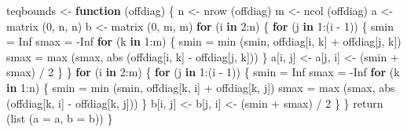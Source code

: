 \documentclass[
  12pt,
]{book}
\newenvironment{Shaded}{\begin{snugshade}}{\end{snugshade}}
\newcommand{\AttributeTok}[1]{\textcolor[rgb]{0.77,0.63,0.00}{#1}}
\newcommand{\ConstantTok}[1]{\textcolor[rgb]{0.00,0.00,0.00}{#1}}
\newcommand{\ControlFlowTok}[1]{\textcolor[rgb]{0.13,0.29,0.53}{\textbf{#1}}}
\newcommand{\DecValTok}[1]{\textcolor[rgb]{0.00,0.00,0.81}{#1}}
\newcommand{\FunctionTok}[1]{\textcolor[rgb]{0.00,0.00,0.00}{#1}}
\newcommand{\NormalTok}[1]{#1}
\newcommand{\OtherTok}[1]{\textcolor[rgb]{0.56,0.35,0.01}{#1}}
\newcommand{\SpecialCharTok}[1]{\textcolor[rgb]{0.00,0.00,0.00}{#1}}
\theoremstyle{definition}
\theoremstyle{definition}
\theoremstyle{definition}
\theoremstyle{definition}
\theoremstyle{remark}
\begin{document}
\begin{Shaded}
\begin{Highlighting}[]
\NormalTok{teqbounds }\OtherTok{\textless{}{-}} \ControlFlowTok{function}\NormalTok{ (offdiag) \{}
\NormalTok{  n }\OtherTok{\textless{}{-}} \FunctionTok{nrow}\NormalTok{ (offdiag)}
\NormalTok{  m }\OtherTok{\textless{}{-}} \FunctionTok{ncol}\NormalTok{ (offdiag)}
\NormalTok{  a }\OtherTok{\textless{}{-}} \FunctionTok{matrix}\NormalTok{ (}\DecValTok{0}\NormalTok{, n, n)}
\NormalTok{  b }\OtherTok{\textless{}{-}} \FunctionTok{matrix}\NormalTok{ (}\DecValTok{0}\NormalTok{, m, m)}
  \ControlFlowTok{for}\NormalTok{ (i }\ControlFlowTok{in} \DecValTok{2}\SpecialCharTok{:}\NormalTok{n) \{}
    \ControlFlowTok{for}\NormalTok{ (j }\ControlFlowTok{in} \DecValTok{1}\SpecialCharTok{:}\NormalTok{(i }\SpecialCharTok{{-}} \DecValTok{1}\NormalTok{)) \{}
\NormalTok{      smin }\OtherTok{=} \ConstantTok{Inf}
\NormalTok{      smax }\OtherTok{=} \SpecialCharTok{{-}}\ConstantTok{Inf}
      \ControlFlowTok{for}\NormalTok{ (k }\ControlFlowTok{in} \DecValTok{1}\SpecialCharTok{:}\NormalTok{m) \{}
\NormalTok{        smin }\OtherTok{=} \FunctionTok{min}\NormalTok{ (smin, offdiag[i, k] }\SpecialCharTok{+}\NormalTok{ offdiag[j, k])}
\NormalTok{        smax }\OtherTok{=} \FunctionTok{max}\NormalTok{ (smax, }\FunctionTok{abs}\NormalTok{ (offdiag[i, k] }\SpecialCharTok{{-}}\NormalTok{ offdiag[j, k]))}
\NormalTok{      \}}
\NormalTok{      a[i, j] }\OtherTok{\textless{}{-}}\NormalTok{ a[j, i] }\OtherTok{\textless{}{-}}\NormalTok{ (smin }\SpecialCharTok{+}\NormalTok{ smax) }\SpecialCharTok{/} \DecValTok{2}
\NormalTok{    \}}
\NormalTok{  \}}
  \ControlFlowTok{for}\NormalTok{ (i }\ControlFlowTok{in} \DecValTok{2}\SpecialCharTok{:}\NormalTok{m) \{}
    \ControlFlowTok{for}\NormalTok{ (j }\ControlFlowTok{in} \DecValTok{1}\SpecialCharTok{:}\NormalTok{(i }\SpecialCharTok{{-}} \DecValTok{1}\NormalTok{)) \{}
\NormalTok{      smin }\OtherTok{=} \ConstantTok{Inf}
\NormalTok{      smax }\OtherTok{=} \SpecialCharTok{{-}}\ConstantTok{Inf}
      \ControlFlowTok{for}\NormalTok{ (k }\ControlFlowTok{in} \DecValTok{1}\SpecialCharTok{:}\NormalTok{n) \{}
\NormalTok{        smin }\OtherTok{=} \FunctionTok{min}\NormalTok{ (smin, offdiag[k, i] }\SpecialCharTok{+}\NormalTok{ offdiag[k, j])}
\NormalTok{        smax }\OtherTok{=} \FunctionTok{max}\NormalTok{ (smax, }\FunctionTok{abs}\NormalTok{ (offdiag[k, i] }\SpecialCharTok{{-}}\NormalTok{ offdiag[k, j]))}
\NormalTok{      \}}
\NormalTok{      b[i, j] }\OtherTok{\textless{}{-}}\NormalTok{ b[j, i] }\OtherTok{\textless{}{-}}\NormalTok{ (smin }\SpecialCharTok{+}\NormalTok{ smax) }\SpecialCharTok{/} \DecValTok{2}
\NormalTok{    \}}
\NormalTok{  \}}
  \FunctionTok{return}\NormalTok{ (}\FunctionTok{list}\NormalTok{ (}\AttributeTok{a =}\NormalTok{ a, }\AttributeTok{b =}\NormalTok{ b))}
\NormalTok{\}}
\end{Highlighting}
\end{Shaded}
\end{document}
